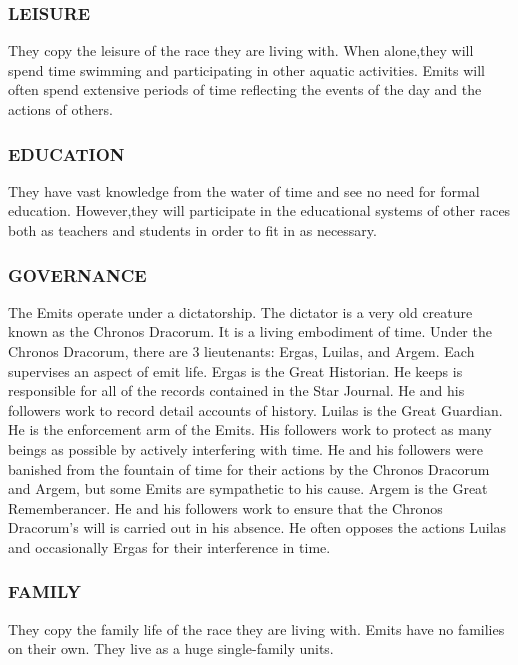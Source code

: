 \subsubsection{LEISURE}
They copy the leisure of the race they are living with.  When alone,they will
spend time swimming and participating in other aquatic activities.  Emits will
often spend extensive periods of time reflecting the events of the day and the
actions of others.
\subsubsection{EDUCATION}
They have vast knowledge from the water of time and see no need for formal
education.  However,they will participate in the educational systems of other
races both as teachers and students in order to fit in as necessary.
\subsubsection{GOVERNANCE}
The Emits operate under a dictatorship.  The dictator is a very old creature
known as the Chronos Dracorum.  It is a living embodiment of time.  Under the
Chronos Dracorum, there are 3 lieutenants: Ergas, Luilas, and Argem.  Each
supervises an aspect of emit life.  Ergas is the Great Historian.  He keeps is
responsible for all of the records contained in the Star Journal.  He and his
followers work to record detail accounts of history.  Luilas is the Great
Guardian.  He is the enforcement arm of the Emits.  His followers work to
protect as many beings as possible by actively interfering with time.  He and
his followers were banished from the fountain of time for their actions by the
Chronos Dracorum and Argem, but some Emits are sympathetic to his cause.  Argem
is the Great Rememberancer.  He and his followers work to ensure that the
Chronos Dracorum's will is carried out in his absence.  He often opposes the
actions Luilas and occasionally Ergas for their interference in time.
\subsubsection{FAMILY}
They copy the family life of the race they are living with.  Emits have no
families on their own.  They live as a huge single-family units.
